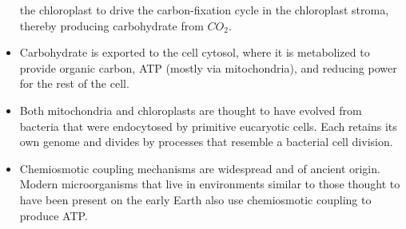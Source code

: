 \begin{itemize}
the chloroplast to drive the carbon-fixation cycle in the chloroplast
stroma, thereby producing carbohydrate from $CO_2$.
\item Carbohydrate is exported to the cell cytosol, where it is metabolized
to provide organic carbon, ATP (mostly via mitochondria), and reducing
power for the rest of the cell.
\item Both mitochondria and chloroplasts are thought to have evolved
from bacteria that were endocytosed by primitive eucaryotic cells.
Each retains its own genome and divides by processes that resemble
a bacterial cell division.
\item Chemiosmotic coupling mechanisms are widespread and of ancient
origin. Modern microorganisms that live in environments similar
to those thought to have been present on the early Earth also use
chemiosmotic coupling to produce ATP.
\end{itemize}
